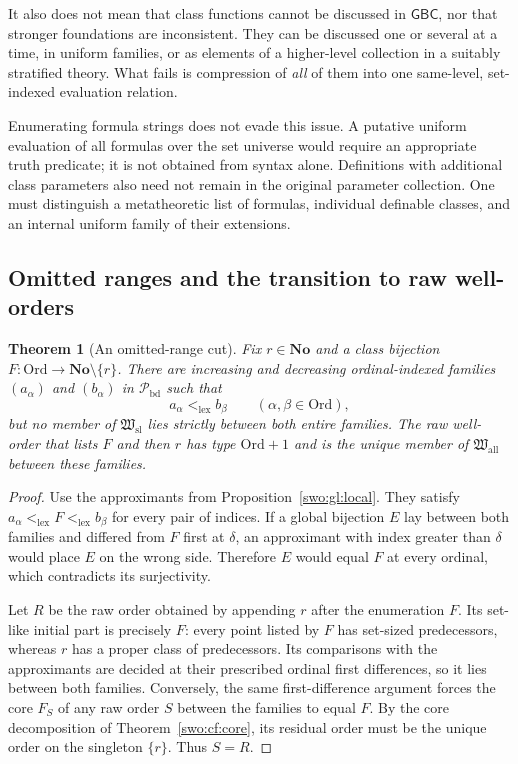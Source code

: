 \documentclass[11pt]{article}
\newtheorem{theorem}{Theorem}[section]
\theoremstyle{definition}
\theoremstyle{remark}
\newcommand{\No}{\mathbf{No}}
\newcommand{\Ord}{\mathrm{Ord}}
\newcommand{\Hsl}{\mathfrak W_{\mathrm{sl}}}
\newcommand{\Hall}{\mathfrak W_{\mathrm{all}}}
\newcommand{\Pbd}{\mathcal P_{\mathrm{bd}}}
\newcommand{\lex}{\mathrm{lex}}
\newcommand{\GBC}{\mathsf{GBC}}
\begin{document}
It also does not mean that class functions cannot be discussed in
$\GBC$, nor that stronger foundations are inconsistent. They can be
discussed one or several at a time, in uniform families, or as elements
of a higher-level collection in a suitably stratified theory.
What fails is compression of \emph{all} of them into one same-level,
set-indexed evaluation relation.

Enumerating formula strings does not evade this issue. A putative
uniform evaluation of all formulas over the set universe would require
an appropriate truth predicate; it is not obtained from syntax alone.
Definitions with additional class parameters also need not remain in
the original parameter collection. One must distinguish a metatheoretic
list of formulas, individual definable classes, and an internal uniform
family of their extensions.

\subsection{Omitted ranges and the transition to raw well-orders}

\begin{theorem}[An omitted-range cut]\label{swo:gl:omitted}
Fix $r\in\No$ and a class bijection
$F:\Ord\to\No\setminus\{r\}$.  There are increasing and decreasing
ordinal-indexed families $(a_\alpha)$ and $(b_\alpha)$ in $\Pbd$ such that
\[
 a_\alpha<_{\lex}b_\beta\qquad(\alpha,\beta\in\Ord),
\]
but no member of $\Hsl$ lies strictly between both entire families.
The raw well-order that lists $F$ and then $r$ has type $\Ord+1$ and is the
unique member of $\Hall$ between these families.
\end{theorem}

\begin{proof}
Use the approximants from Proposition~\ref{swo:gl:local}.  They satisfy
$a_\alpha<_{\lex}F<_{\lex}b_\beta$ for every pair of indices.  If a global
bijection $E$ lay between both families and differed from $F$ first at
$\delta$, an approximant with index greater than $\delta$ would place $E$
on the wrong side.  Therefore $E$ would equal $F$ at every ordinal, which
contradicts its surjectivity.

Let $R$ be the raw order obtained by appending $r$ after the enumeration $F$.
Its set-like initial part is precisely $F$: every point listed by $F$ has
set-sized predecessors, whereas $r$ has a proper class of predecessors.
Its comparisons with the approximants are decided at their prescribed
ordinal first differences, so it lies between both families.  Conversely,
the same first-difference argument forces the core $F_S$ of any raw order
$S$ between the families to equal $F$.  By the core decomposition of
Theorem~\ref{swo:cf:core}, its residual order must be the unique order on the
singleton $\{r\}$.  Thus $S=R$.
\end{proof}
\end{document}
